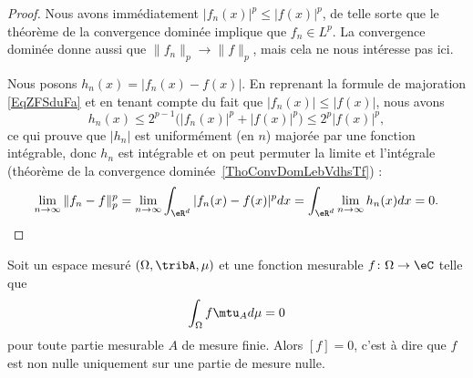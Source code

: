 \begin{proof}
    Nous avons immédiatement \( | f_n(x) |^p\leq | f(x) |^p\), de telle sorte que le théorème de la convergence dominée implique que \( f_n\in L^p\). La convergence dominée donne aussi que \( \| f_n \|_p\to\| f \|_p\), mais cela ne nous intéresse pas ici.

    Nous posons \( h_n(x)= | f_n(x)-f(x) | \). En reprenant la formule de majoration \eqref{EqZFSduFa} et en tenant compte du fait que \( | f_n(x) |\leq | f(x) |\), nous avons
   \begin{equation}
       h_n(x)\leq 2^{p-1}\big( | f_n(x) |^p+| f(x) |^p \big)\leq 2^p| f(x) |^p,
   \end{equation}
   ce qui prouve que \( | h_n |\) est uniformément (en \( n\)) majorée par une fonction intégrable, donc \( h_n\) est intégrable et on peut permuter la limite et l'intégrale (théorème de la convergence dominée~\ref{ThoConvDomLebVdhsTf}) :
   \begin{equation}
       \lim_{n\to \infty} \| f_n-f \|^p_p=\lim_{n\to \infty} \int_{\eR^d}| f_n(x)-f(x) |^pdx=\int_{\eR^d}\lim_{n\to \infty} h_n(x)dx=0.
   \end{equation}
\end{proof}

\begin{proposition} \label{PropRERZooYcEchc}
    Soit un espace mesuré \( (\Omega,\tribA,\mu)\) et une fonction mesurable \( f\colon \Omega\to \eC \) telle que
    \begin{equation}
        \int_{\Omega}f\mtu_Ad\mu=0
    \end{equation}
    pour toute partie mesurable \( A\) de mesure finie. Alors \( [f]=0\), c'est à dire que \( f\) est non nulle uniquement sur une partie de mesure nulle.
\end{proposition}

